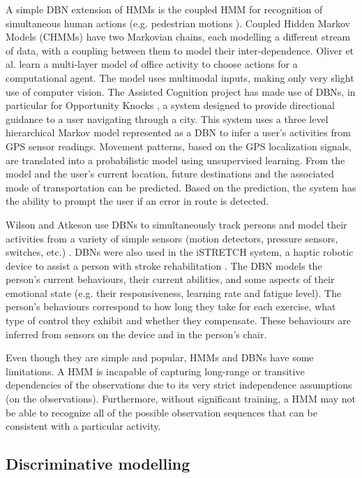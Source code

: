 A simple DBN extension of HMMs is the coupled HMM for recognition of simultaneous human actions (e.g. pedestrian motions \cite{Brand1997}). Coupled Hidden Markov Models (CHMMs) have two Markovian chains, each modelling a different stream of data, with a coupling between them to model their inter-dependence. Oliver et al. \cite{Oliver2004} learn a multi-layer model of office activity to choose actions for a computational agent. The model uses multimodal inputs, making only very slight use of computer vision. The Assisted Cognition project \cite{Kautz2002} has made use of DBNs, in particular for Opportunity Knocks \cite{Liao2007a}, a system designed to provide directional guidance to a user navigating through a city. This system uses a three level hierarchical Markov model represented as a DBN to infer a user’s activities from GPS sensor readings. Movement patterns, based on the GPS localization signals, are translated into a probabilistic model using unsupervised learning. From the model and the user’s current location, future destinations and the associated mode of transportation can be predicted. Based on the prediction, the system has the ability to prompt the user if an error in route is detected.

Wilson and Atkeson use DBNs to simultaneously track persons and model their activities from a variety of simple sensors (motion detectors, pressure sensors, switches, etc.) \cite{Wilson2005}. DBNs were also used in the iSTRETCH system, a haptic robotic device to assist a person with stroke rehabilitation \cite{Kan2011}. The DBN models the person’s current behaviours, their current abilities, and some aspects of their emotional state (e.g. their responsiveness, learning rate and fatigue level). The person’s behaviours correspond to how long they take for each exercise, what type of control they exhibit and whether they compensate. These behaviours are inferred from sensors on the device and in the person’s chair.

Even though they are simple and popular, HMMs and DBNs have some limitations. A HMM is incapable of capturing long-range or transitive dependencies of the observations due to its very strict independence assumptions (on the observations). Furthermore, without significant training, a HMM may not be able to recognize all of the possible observation sequences that can be consistent with a particular activity.

\subsection{Discriminative modelling}

